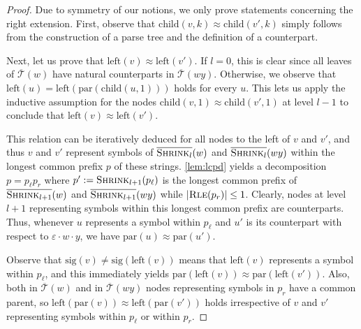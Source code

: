 \documentclass[a4paper]{article}
\theoremstyle{remark}
\newcommand{\rle}{\textsc{Rle}}
\newcommand{\shrink}[1]{\ensuremath{\textsc{Shrink}_{#1}}}
\newcommand{\cshrink}[1]{\ensuremath{\overline{\textsc{Shrink}_{#1}}}}
\newcommand{\ustree}{\mathcal{\overline{T}}}
\newcommand{\uspar}{\mathrm{par}}
\newcommand{\usleft}{\mathrm{left}}
\newcommand{\uschild}{\mathrm{child}}
\newcommand{\ussig}{\mathrm{sig}}
\newcommand{\eps}{\varepsilon}
\newcommand{\edot}{{\cdot}}
\begin{document}
\begin{proof}
Due to symmetry of our notions, we only prove statements concerning the right extension.
First, observe that $\uschild(v,k)\approx \uschild(v',k)$ simply follows from the construction
of a parse tree and the definition of a counterpart.

Next, let us prove that $\usleft(v)\approx \usleft(v')$. If $l=0$, this is clear since
all leaves of $\ustree(w)$ have natural counterparts in $\ustree(wy)$.
Otherwise, we observe that $\usleft(u)=\usleft(\uspar(\uschild(u,1)))$ holds for every $u$.
This lets us apply the inductive assumption
for the nodes $\uschild(v,1)\approx \uschild(v',1)$ at level $l-1$ to conclude that $\usleft(v)\approx \usleft(v')$.

This relation can be iteratively deduced for all nodes to the left of $v$ and $v'$,
and thus $v$ and $v'$ represent symbols of $\cshrink{l}(w)$ and $\cshrink{l}(wy)$ within the longest
common prefix $p$ of these strings.
\cref{lem:lcpd} yields a decomposition $p=p_\ell p_r$ where $p':=\shrink{l+1}(p_\ell)$ is the longest common prefix of $\cshrink{l+1}(w)$
and $\cshrink{l+1}(wy)$ while $|\rle(p_r)|\le 1$. Clearly, nodes at level $l+1$ representing symbols within this longest
common prefix are counterparts.
Thus, whenever $u$ represents a symbol within $p_\ell$ and $u'$ is its counterpart with respect to $\eps \edot w \edot y$,
we have $\uspar(u)\approx \uspar(u')$.

Observe that $\ussig(v)\ne \ussig(\usleft(v))$ means that $\usleft(v)$ represents a symbol within $p_\ell$, and this immediately
yields $\uspar(\usleft(v))\approx \uspar(\usleft(v'))$.
Also, both in $\ustree(w)$ and in $\ustree(wy)$ nodes representing symbols in $p_r$ have a common parent, so
$\usleft(\uspar(v))\approx \usleft(\uspar(v'))$ holds irrespective of $v$ and $v'$ representing symbols within $p_\ell$ or within $p_r$.
\end{proof}
\end{document}
